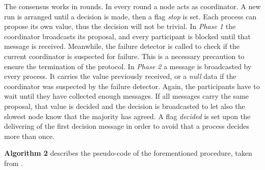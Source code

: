 \documentclass[a4paper]{article}
\begin{document}
The consensus works in rounds. In every round a node acts as coordinator. A new run is arranged until a decision is made, then a flag \emph{stop} is set.
Each process can propose its own value, thus the decision will not be trivial. In \emph{Phase 1} the coordinator broadcasts its proposal, and every participant is blocked until that message is received. Meanwhile, the failure detector is called to check if the current coordinator is suspected for failure. This is a necessary precaution to ensure the termination of the protocol.
In \emph{Phase 2} a message is broadcasted by every process. It carries the value previously received, or a \emph{null} data if the coordinator was suspected by the failure detector. Again, the participants have to wait until they have collected enough messages. If all messages carry the same proposal, that value is decided and the decision is broadcasted to let also the slowest node know that the majority has agreed.
A flag \emph{decided} is set upon the delivering of the first decision message in order to avoid that a process decides more than once.

\textbf{Algorithm 2} describes the pseudo-code of the forementioned procedure, taken from \cite{fdconsensus}.
\end{document}
